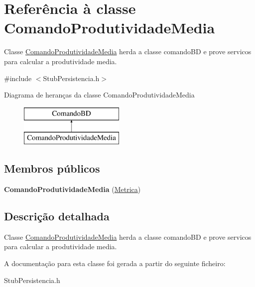 \hypertarget{class_comando_produtividade_media}{
\section{\-Referência à classe \-Comando\-Produtividade\-Media}
\label{class_comando_produtividade_media}
}


\-Classe \hyperlink{class_comando_produtividade_media}{\-Comando\-Produtividade\-Media} herda a classe comando\-B\-D e prove servicos para calcular a produtividade media.  




{\ttfamily \#include $<$\-Stub\-Persistencia.\-h$>$}

\-Diagrama de heranças da classe \-Comando\-Produtividade\-Media\begin{figure}[H]
\begin{center}
\leavevmode
\includegraphics[height=2.000000cm]{class_comando_produtividade_media}
\end{center}
\end{figure}
\subsection*{\-Membros públicos}
\begin{DoxyCompactItemize}
\item 
\hypertarget{class_comando_produtividade_media_abef9a9b7e5dcca53d6dc14fd82dab701}{
{\bfseries \-Comando\-Produtividade\-Media} (\hyperlink{class_metrica}{\-Metrica})}
\label{class_comando_produtividade_media_abef9a9b7e5dcca53d6dc14fd82dab701}

\end{DoxyCompactItemize}


\subsection{\-Descrição detalhada}
\-Classe \hyperlink{class_comando_produtividade_media}{\-Comando\-Produtividade\-Media} herda a classe comando\-B\-D e prove servicos para calcular a produtividade media. 

\-A documentação para esta classe foi gerada a partir do seguinte ficheiro\-:\begin{DoxyCompactItemize}
\item 
\-Stub\-Persistencia.\-h\end{DoxyCompactItemize}

